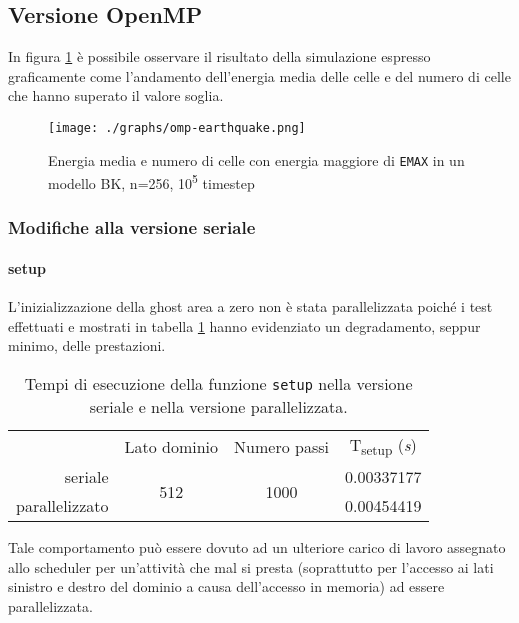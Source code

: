 \subsection{Versione OpenMP}

In figura \ref{fig:simulation1} è possibile osservare il risultato della
simulazione espresso graficamente come l'andamento dell'energia media delle
celle e del numero di celle che hanno superato il valore soglia.

\begin{figure}[!ht]
  \centering
  \texttt{[image: ./graphs/omp-earthquake.png]}
  \caption{Energia media e numero di celle con energia maggiore di \texttt{EMAX}
  in un modello BK, n=256, 10\textsuperscript{5}
  timestep}\label{fig:simulation1}
\end{figure}

\subsubsection{Modifiche alla versione seriale}

\paragraph{setup}L'inizializzazione della ghost area a zero non è stata
parallelizzata poiché i test effettuati e mostrati in tabella
\ref{tab:parallelghostarea} hanno evidenziato un degradamento, seppur minimo,
delle prestazioni.

\begin{table}[ht]
\centering
\begin{tabular}{rccc}
\cmidrule[\heavyrulewidth]{2-4}
 & Lato dominio & Numero passi & T\textsubscript{setup} (\textit{s})\\
 \cmidrule[\lightrulewidth]{2-4}
 seriale & \multirow{2}{*}{512} & \multirow{2}{*}{1000} & 0.00337177\\
 parallelizzato &&& 0.00454419\\
\cmidrule[\heavyrulewidth]{2-4}
\end{tabular}
\caption{\label{tab:parallelghostarea}Tempi di esecuzione della funzione
\texttt{setup} nella versione seriale e nella versione parallelizzata.}
\end{table}

Tale comportamento può essere dovuto ad un ulteriore carico di lavoro assegnato
allo scheduler per un'attività che mal si presta (soprattutto per l'accesso ai
lati sinistro e destro del dominio a causa dell'accesso in memoria) ad essere
parallelizzata.

